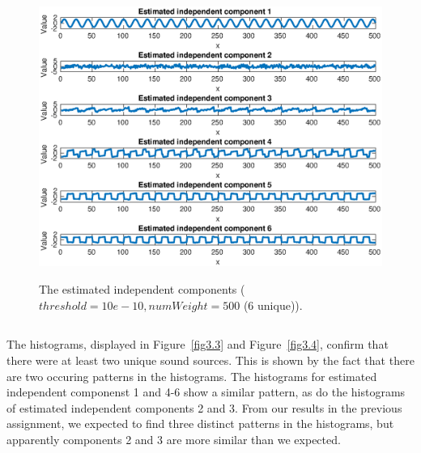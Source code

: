 \documentclass[10pt]{article}
\begin{document}
\begin{figure}
  \centering
  \caption{The estimated independent components ($threshold = 10e-10, numWeight = 500$ (6 unique)).}
    \includegraphics[width=\columnwidth]{Ass3_all.eps}
  \label{fig3.2}
\end{figure}

\subsection{}
The histograms, displayed in Figure~\ref{fig3.3} and Figure~\ref{fig3.4}, confirm that there were at least two unique sound sources. This is shown by the fact that there are two occuring patterns in the histograms.
The histograms for estimated independent componenst 1 and 4-6 show a similar pattern, 
as do the histograms of estimated independent components 2 and 3.
From our results in the previous assignment, we expected to find three distinct patterns in the histograms,
but apparently components 2 and 3 are more similar than we expected.
\end{document}
